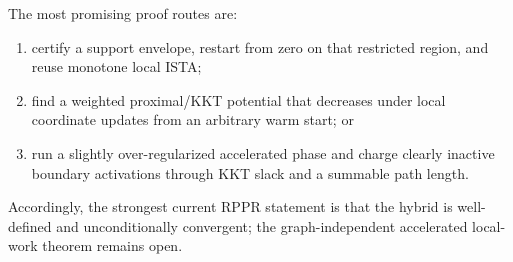 The most promising proof routes are:
\begin{enumerate}[leftmargin=2em]
  \item certify a support envelope, restart from zero on that restricted
        region, and reuse monotone local ISTA;
  \item find a weighted proximal/KKT potential that decreases under local
        coordinate updates from an arbitrary warm start; or
  \item run a slightly over-regularized accelerated phase and charge clearly
        inactive boundary activations through KKT slack and a summable path
        length.
\end{enumerate}
Accordingly, the strongest current RPPR statement is that the hybrid is
well-defined and unconditionally convergent; the graph-independent
accelerated local-work theorem remains open.
